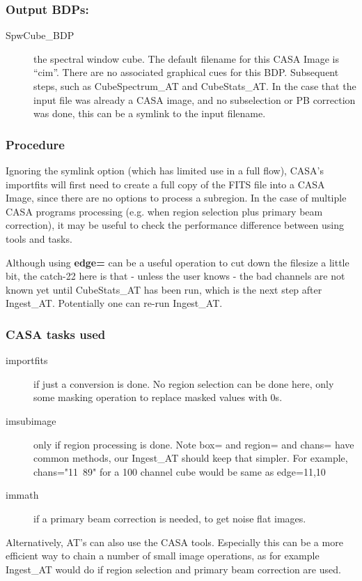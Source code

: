 \subsubsection{Output BDPs:}

\begin{description}

\item[SpwCube\_BDP] the spectral window cube.
The default filename for this CASA Image is ``cim''.
There are no associated graphical cues for this BDP. Subsequent steps,
such as CubeSpectrum\_AT and CubeStats\_AT. In the case that the input
file was already a CASA image, and no subselection or PB correction
was done, this can be a symlink to the input filename.

\end{description}

\subsubsection{Procedure}

Ignoring the symlink option (which has limited use in a full flow),
CASA's importfits will first need to create a full copy of the FITS
file into a CASA Image, since there are no options to process a
subregion. In the case of multiple CASA programs processing (e.g. when
region selection plus primary beam correction), it may be useful to
check the performance difference between using tools and tasks.

Although using {\bf edge=} can be a useful operation to cut down the
filesize a little bit, the catch-22 here is that - unless the user
knows - the bad channels are not known yet until CubeStats\_AT has
been run, which is the next step after Ingest\_AT. Potentially one can
re-run Ingest\_AT.

\subsubsection{CASA tasks used}

\begin{description}

\item[importfits] if just a conversion is done. No region selection
  can be done here, only some masking operation to replace masked
  values with 0s.

\item[imsubimage] only if region processing is done.  Note box= and
  region= and chans= have common methods, our Ingest\_AT should keep
  that simpler.  For example, chans="11~89" for a 100 channel cube
  would be same as edge=11,10

\item[immath] if a primary beam correction is needed, to get noise
  flat images.

\end{description}

Alternatively, AT's can also use the CASA tools. Especially this can be
a more efficient way to chain a number of small image operations, as
for example Ingest\_AT would do if region selection and primary beam
correction are used. 




\clearpage
